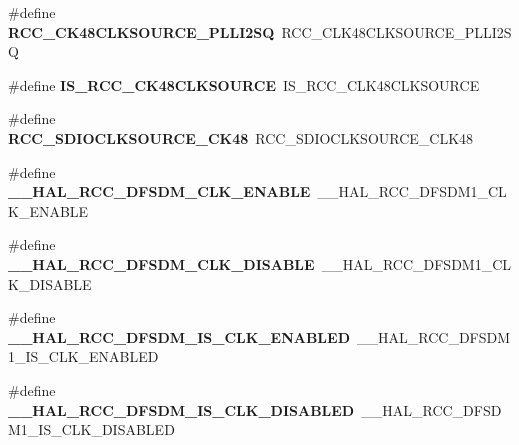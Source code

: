 \begin{DoxyCompactItemize}
\#define {\bfseries R\+C\+C\+\_\+\+C\+K48\+C\+L\+K\+S\+O\+U\+R\+C\+E\+\_\+\+P\+L\+L\+I2\+SQ}~R\+C\+C\+\_\+\+C\+L\+K48\+C\+L\+K\+S\+O\+U\+R\+C\+E\+\_\+\+P\+L\+L\+I2\+SQ
\item 
\mbox{\label{group___h_a_l___r_c_c___aliased_gadc3701af78409a4623aa3462d5c18916}} 
\#define {\bfseries I\+S\+\_\+\+R\+C\+C\+\_\+\+C\+K48\+C\+L\+K\+S\+O\+U\+R\+CE}~I\+S\+\_\+\+R\+C\+C\+\_\+\+C\+L\+K48\+C\+L\+K\+S\+O\+U\+R\+CE
\item 
\mbox{\label{group___h_a_l___r_c_c___aliased_ga9ef0bc577f0de24e85e10db1751ff5c7}} 
\#define {\bfseries R\+C\+C\+\_\+\+S\+D\+I\+O\+C\+L\+K\+S\+O\+U\+R\+C\+E\+\_\+\+C\+K48}~R\+C\+C\+\_\+\+S\+D\+I\+O\+C\+L\+K\+S\+O\+U\+R\+C\+E\+\_\+\+C\+L\+K48
\item 
\mbox{\label{group___h_a_l___r_c_c___aliased_gad3863899a558adce00ea80316fc21e8b}} 
\#define {\bfseries \+\_\+\+\_\+\+H\+A\+L\+\_\+\+R\+C\+C\+\_\+\+D\+F\+S\+D\+M\+\_\+\+C\+L\+K\+\_\+\+E\+N\+A\+B\+LE}~\+\_\+\+\_\+\+H\+A\+L\+\_\+\+R\+C\+C\+\_\+\+D\+F\+S\+D\+M1\+\_\+\+C\+L\+K\+\_\+\+E\+N\+A\+B\+LE
\item 
\mbox{\label{group___h_a_l___r_c_c___aliased_ga2ac6a3d5b835993a5ecd5d3e384f936a}} 
\#define {\bfseries \+\_\+\+\_\+\+H\+A\+L\+\_\+\+R\+C\+C\+\_\+\+D\+F\+S\+D\+M\+\_\+\+C\+L\+K\+\_\+\+D\+I\+S\+A\+B\+LE}~\+\_\+\+\_\+\+H\+A\+L\+\_\+\+R\+C\+C\+\_\+\+D\+F\+S\+D\+M1\+\_\+\+C\+L\+K\+\_\+\+D\+I\+S\+A\+B\+LE
\item 
\mbox{\label{group___h_a_l___r_c_c___aliased_ga48f2e45cb7731ed895e7f96e02dd149c}} 
\#define {\bfseries \+\_\+\+\_\+\+H\+A\+L\+\_\+\+R\+C\+C\+\_\+\+D\+F\+S\+D\+M\+\_\+\+I\+S\+\_\+\+C\+L\+K\+\_\+\+E\+N\+A\+B\+L\+ED}~\+\_\+\+\_\+\+H\+A\+L\+\_\+\+R\+C\+C\+\_\+\+D\+F\+S\+D\+M1\+\_\+\+I\+S\+\_\+\+C\+L\+K\+\_\+\+E\+N\+A\+B\+L\+ED
\item 
\mbox{\label{group___h_a_l___r_c_c___aliased_gaf56f10b32c0371bdb4e4b9dcaf3069ea}} 
\#define {\bfseries \+\_\+\+\_\+\+H\+A\+L\+\_\+\+R\+C\+C\+\_\+\+D\+F\+S\+D\+M\+\_\+\+I\+S\+\_\+\+C\+L\+K\+\_\+\+D\+I\+S\+A\+B\+L\+ED}~\+\_\+\+\_\+\+H\+A\+L\+\_\+\+R\+C\+C\+\_\+\+D\+F\+S\+D\+M1\+\_\+\+I\+S\+\_\+\+C\+L\+K\+\_\+\+D\+I\+S\+A\+B\+L\+ED

\end{DoxyCompactItemize}

